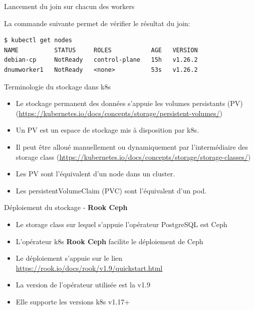 
\begin{frame}[fragile]{Lancement du join sur chacun des workers}

La commande suivante permet de vérifier le résultat du join:
\begin{tiny}
\begin{Verbatim}[commandchars=\&\@\@]
$ kubectl get nodes
NAME          STATUS     ROLES           AGE   VERSION
debian-cp     NotReady   control-plane   15h   v1.26.2
dnumworker1   NotReady   <none>          53s   v1.26.2

\end{Verbatim}
\end{tiny}

\end{frame}


\begin{frame}[shrink=8,fragile]{Terminologie du stockage dans k8s}

\begin{itemize}
   \item Le stockage permanent des données s'appuie les volumes persistants (PV) (\url{https://kubernetes.io/docs/concepts/storage/persistent-volumes/})
   \item Un PV est un espace de stockage mis à disposition par k8s.
   \item Il peut être alloué manuellement ou dynamiquement par l'intermédiaire des storage class (\url{https://kubernetes.io/docs/concepts/storage/storage-classes/})
   \item Les PV sont l'équivalent d'un node dans un cluster.
   \item Les persistentVolumeClaim (PVC) sont l'équivalent d'un pod.
\end{itemize}

\end{frame}


\begin{frame}[fragile]{Déploiement du stockage - \textbf{Rook Ceph}}

\begin{itemize}
   \item Le storage class sur lequel s'appuie l'opérateur PostgreSQL est Ceph
   \item L'opérateur k8s \textbf{Rook Ceph} facilite le déploiement de Ceph
   \item Le déploiement s'appuie sur le lien \url{https://rook.io/docs/rook/v1.9/quickstart.html}
   \item La version de l'opérateur utilisée est la v1.9
   \item Elle supporte les versions k8s v1.17+
\end{itemize}

\end{frame}


